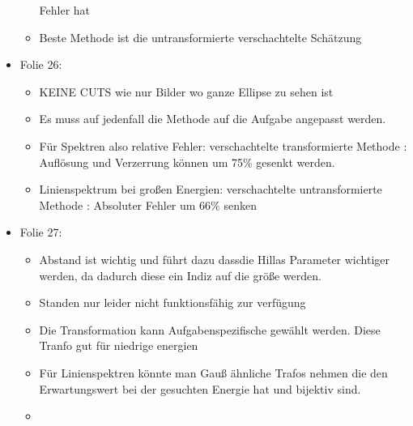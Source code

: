 \documentclass[
  bibliography=totoc,     %
  captions=tableheading,  %
  titlepage=firstiscover, %
]{scrartcl}
\begin{document}
\begin{itemize}
\begin{itemize}
              Fehler hat
        \item Beste Methode ist die untransformierte verschachtelte Schätzung
      \end{itemize}
    \item Folie 26:
      \begin{itemize}
        \item KEINE CUTS wie nur Bilder wo ganze Ellipse zu sehen ist
        \item Es muss auf jedenfall die Methode auf die Aufgabe angepasst werden.
        \item Für Spektren also relative Fehler: verschachtelte transformierte Methode  : Auflösung und Verzerrung können um 75\% gesenkt werden.
        \item Linienspektrum bei großen Energien: verschachtelte untransformierte Methode : Absoluter Fehler um 66\% senken
      \end{itemize}
    \item Folie 27:
      \begin{itemize}
        \item Abstand ist wichtig und führt dazu dassdie Hillas Parameter wichtiger werden, da dadurch diese ein Indiz auf die größe werden.
        \item Standen nur leider nicht funktionsfähig zur verfügung
        \item Die Transformation kann Aufgabenspezifische gewählt werden. Diese Tranfo gut für niedrige energien
        \item Für Linienspektren könnte man Gauß ähnliche Trafos nehmen die den Erwartungswert bei der gesuchten Energie hat und bijektiv sind.
        \item
      \end{itemize}
  \end{itemize}
\end{document}
